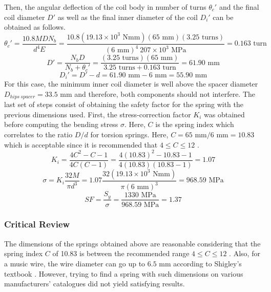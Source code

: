 Then, the angular deflection of the coil body in number of turns $\theta_c'$ and the final coil diameter $D'$ as well as the final inner diameter of the coil $D_i'$ can be obtained as follows.
\begin{equation}
    \theta_c' = \frac{10.8 M D N_b}{d^4 E} = \frac{10.8 (19.13\times 10^3\text{ Nmm})(65\text{ mm})(3.25\text{ turns})}{(6\text{ mm})^4\ 207\times 10^3\text{ MPa}}= 0.163\text{ turn}
\end{equation}
\begin{equation}
    D' = \frac{N_b D}{N_b + \theta_c'} = \frac{(3.25\text{ turns})(65\text{ mm})}{3.25\text{ turns}+0.163\text{ turn}}= 61.90\text{ mm}
\end{equation}
\begin{equation}
    D_i' = D' - d = 61.90\text{ mm} - 6\text{ mm} = 55.90\text{ mm}
\end{equation}
For this case, the minimum inner coil diameter is well above the spacer diameter $D_{hips\ spacer} = 33.5\text{ mm}$ and therefore, both components should not interfere. The last set of steps consist of obtaining the safety factor for the spring with the previous dimensions used. First, the stress-correction factor $K_i$ was obtained before computing the bending stress $\sigma$. Here, $C$ is the spring index which correlates to the ratio $D/d$ for torsion springs. Here, $C= 65\text{ mm}/6\text{ mm} = 10.83$ which is acceptable since it is recommended that $4 \leq C \leq 12$ \cite{budynas_shigleys_2015}.
\begin{equation}
    K_i = \frac{4C^2-C-1}{4C(C-1)} =  \frac{4(10.83)^2-10.83-1}{4(10.83)(10.83-1)} = 1.07
\end{equation}
\begin{equation}
    \sigma = K_i \frac{32 M}{\pi d^3} = 1.07 \frac{32 (19.13\times 10^3\text{ Nmm})}{\pi (6\text{ mm})^3} = 968.59 \text{ MPa}
\end{equation}
\begin{equation}\label{eq:spring_last}
    SF = \frac{S_y}{\sigma} = \frac{1330\text{ MPa}}{968.59\text{ MPa}} = 1.37 
\end{equation}
\subsubsection{Critical Review}
The dimensions of the springs obtained above are reasonable considering that the spring index $C$ of 10.83 is between the recommended range $4 \leq C \leq 12$ \cite{budynas_shigleys_2015}. Also, for a music wire, the wire diameter can go up to $6.5 \text{ mm}$ according to Shigley's textbook \cite{budynas_shigleys_2015}. However, trying to find a spring with such dimensions on various manufacturers' catalogues did not yield satisfying results.

